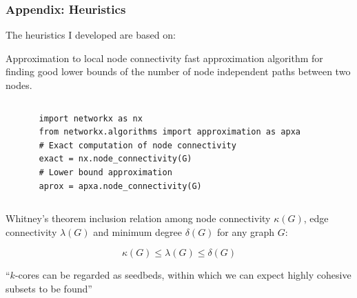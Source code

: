 \documentclass[ignorenonframetext,red,8pt,notes=hide]{beamer}
\begin{document}
\begin{frame}[fragile]
\begin{columns}[c]
\begin{column}{0.7\textwidth}
\end{column}
\end{columns}

\end{frame}

\begin{frame}[fragile]
\frametitle{Appendix: Heuristics}

The heuristics I developed are based on:

\begin{block}{Approximation to local node connectivity}
\citet{white:2001b} fast approximation algorithm for finding good lower bounds of the number of node independent paths between two nodes.

\begin{columns}[c]
\begin{column}{0.1\textwidth}

\end{column}

\begin{column}{0.8\textwidth}
\begin{scriptsize}
\begin{lstlisting}
import networkx as nx
from networkx.algorithms import approximation as apxa
# Exact computation of node connectivity
exact = nx.node_connectivity(G)
# Lower bound approximation
aprox = apxa.node_connectivity(G)
\end{lstlisting}
\end{scriptsize}
\end{column}

\begin{column}{0.1\textwidth}

\end{column}
\end{columns}
\end{block}

\begin{block}{Whitney's theorem}
inclusion relation among node connectivity $\kappa(G)$, edge connectivity $\lambda(G)$ and minimum degree $\delta(G)$ for any graph $G$:

\begin{equation*}
\kappa(G) \le \lambda(G) \le \delta(G)
\end{equation*}

``$k$-cores can be regarded as seedbeds, within which we can expect highly cohesive subsets to be found'' \citet[281]{seidman:1983}
\end{block}
\end{frame}
\end{document}

